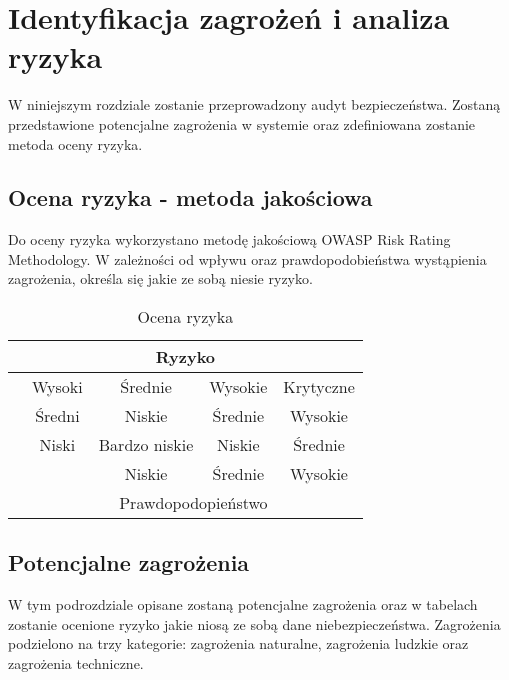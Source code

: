 \newpage\section{Identyfikacja zagrożeń \newline i analiza ryzyka}
W niniejszym rozdziale zostanie przeprowadzony audyt bezpieczeństwa. Zostaną przedstawione potencjalne zagrożenia w systemie oraz zdefiniowana zostanie metoda oceny ryzyka.

\subsection{Ocena ryzyka - metoda jakościowa}
Do oceny ryzyka wykorzystano metodę jakościową OWASP Risk Rating Methodology. W zależności od wpływu oraz prawdopodobieństwa wystąpienia zagrożenia, określa się jakie ze sobą niesie ryzyko. 
\begin{table}[!ht]
	\centering
	\caption{Ocena ryzyka}
	\label{ocenaRyzyka}
	\begin{tabular}{|c|c|c|c|c|}
		\hline 
		\multicolumn{5}{|c|}{Ryzyko}        \\ \hline
		\multirow{4}{*}{} & Wysoki  & \cellcolor{orange} Średnie     &\cellcolor{red}  Wysokie   & \cellcolor{pink} Krytyczne     \\ \cline{2-5} 
		Wpływ	  & Średni  & \cellcolor{yellow} Niskie    	 & \cellcolor{orange} Średnie    & \cellcolor{red}  Wysokie   \\ \cline{2-5}
		& Niski   & \cellcolor{green} Bardzo niskie &  \cellcolor{yellow} Niskie     & \cellcolor{orange} Średnie    \\ \cline{2-5}
		&     	& Niskie   			& Średnie    &  Wysokie    \\ \hline
		& \multicolumn{4}{c|}{Prawdopodopieństwo}  \\  \hline 
	\end{tabular}
\end{table}

\subsection{Potencjalne zagrożenia}
W tym podrozdziale opisane zostaną potencjalne zagrożenia oraz w tabelach zostanie ocenione ryzyko jakie niosą ze sobą dane niebezpieczeństwa. Zagrożenia podzielono na trzy kategorie: zagrożenia naturalne, zagrożenia ludzkie oraz zagrożenia techniczne.

